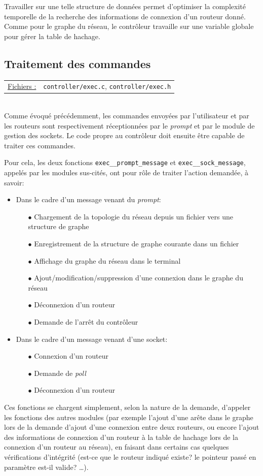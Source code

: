 \documentclass[a4paper,11pt]{article}
\begin{document}
Travailler sur une telle structure de données permet d'optimiser la complexité temporelle de la recherche des informations de connexion d'un routeur donné. Comme pour le graphe du réseau, le contrôleur travaille sur une variable globale pour gérer la table de hachage.

\subsection{Traitement des commandes}

\begin{tabularx}{\linewidth}{lX}
\underline{Fichiers :} & \texttt{controller/exec.c}, \texttt{controller/exec.h}\\
\end{tabularx}\\

Comme évoqué précédemment, les commandes envoyées par l'utilisateur et par les routeurs sont respectivement réceptionnées par le \textit{prompt} et par le module de gestion des sockets.
Le code propre au contrôleur doit ensuite être capable de traiter ces commandes.

Pour cela, les deux fonctions \texttt{exec\_\_prompt\_message} et \texttt{exec\_\_sock\_message}, appelés par les modules sus-cités, ont pour rôle de traiter l'action demandée, à savoir:
\begin{itemize}
 \item Dans le cadre d'un message venant du \textit{prompt}:
 \begin{itemize}
  \item[$\bullet$] Chargement de la topologie du réseau depuis un fichier vers une structure de graphe
  \item[$\bullet$] Enregistrement de la structure de graphe courante dans un fichier
  \item[$\bullet$] Affichage du graphe du réseau dans le terminal
  \item[$\bullet$] Ajout/modification/suppression d'une connexion dans le graphe du réseau
  \item[$\bullet$] Déconnexion d'un routeur
  \item[$\bullet$] Demande de l'arrêt du contrôleur
 \end{itemize}
 \item Dans le cadre d'un message venant d'une socket:
 \begin{itemize}
  \item[$\bullet$] Connexion d'un routeur
  \item[$\bullet$] Demande de \textit{poll}
  \item[$\bullet$] Déconnexion d'un routeur
 \end{itemize}
\end{itemize}
Ces fonctions se chargent simplement, selon la nature de la demande, d'appeler les fonctions des autres modules
(par exemple l'ajout d'une arête dans le graphe lors de la demande d'ajout d'une connexion entre deux routeurs, ou encore l'ajout des informations de connexion d'un routeur à la table de hachage lors de la connexion d'un routeur au réseau), en faisant dans certains cas quelques vérifications d'intégrité (est-ce que le routeur indiqué existe? le pointeur passé en paramètre est-il valide? \dots).
\end{document}
